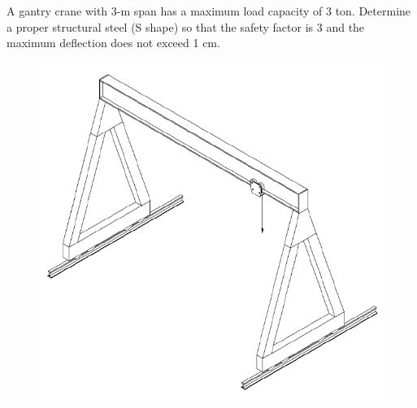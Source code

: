 \documentclass[
10pt,
a4paper,
openany,
svgnames,
]{book}
\begin{document}
\begin{example}
  A gantry crane with 3-m span has a maximum load capacity of 3 ton. Determine a proper structural steel (S shape) so that the safety factor is 3 and the maximum deflection does not exceed 1 cm.

  \begin{figure}[H]
    \centering
    \includegraphics[scale=0.55]{pictures/Simple-load-bearing/gantry-crane}
  \end{figure}
\end{example}
\end{document}
